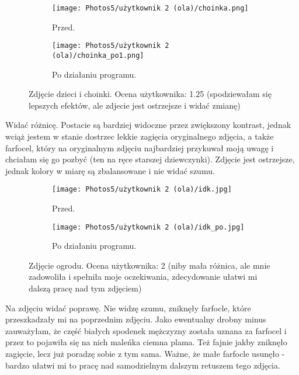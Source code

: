 \documentclass[]{mwart}
\begin{document}
\begin{figure}[h!]
    \centering
    \begin{subfigure}[b]{0.49\textwidth}
        \centering
        \texttt{[image: Photos5/użytkownik 2 (ola)/choinka.png]}
        \caption{Przed.}
    \end{subfigure}
    \hfill
    \begin{subfigure}[b]{0.49\textwidth}
        \centering
        \texttt{[image: Photos5/użytkownik 2 (ola)/choinka\_po1.png]}
        \caption{Po działaniu programu.}
    \end{subfigure}
    \caption{Zdjęcie dzieci i choinki. Ocena użytkownika:  1.25  (spodziewałam się lepszych efektów, ale zdjecie jest ostrzejsze i widać zmianę)}
\end{figure}
Widać różnicę. Postacie są bardziej widoczne przez zwiększony kontrast, jednak wciąż jestem w stanie dostrzec lekkie zagięcia oryginalnego zdjęcia, a także farfocel, który na oryginalnym zdjęciu najbardziej przykuwał moją uwagę i chciałam się go pozbyć (ten na ręce starszej dziewczynki). Zdjęcie jest ostrzejsze, jednak kolory w miarę są zbalansowane i nie widać szumu.

\begin{figure}[h!]
    \centering
    \begin{subfigure}[b]{0.49\textwidth}
        \centering
        \texttt{[image: Photos5/użytkownik 2 (ola)/idk.jpg]}
        \caption{Przed.}
    \end{subfigure}
    \hfill
    \begin{subfigure}[b]{0.49\textwidth}
        \centering
        \texttt{[image: Photos5/użytkownik 2 (ola)/idk\_po.jpg]}
        \caption{Po działaniu programu.}
    \end{subfigure}
    \caption{Zdjęcie ogrodu. Ocena użytkownika:  2 (niby mała różnica, ale mnie zadowoliła i spełniła moje oczekiwania, zdecydowanie ułatwi mi dalszą pracę nad tym zdjęciem)  }
\end{figure}
Na zdjęciu widać poprawę. Nie widzę szumu, zniknęły farfocle, które przeszkadzały mi na poprzednim zdjęciu. Jako ewentualny drobny minus zauważyłam, że część białych spodenek mężczyzny została uznana za farfocel i przez to pojawiła się na nich maleńka ciemna plama. Też fajnie jakby zniknęło zagięcie, lecz już poradzę sobie z tym sama. Ważne, że małe farfocle usunęło - bardzo ułatwi mi to pracę nad samodzielnym dalszym retuszem tego zdjęcia.
\end{document}
